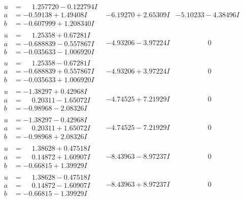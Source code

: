 \documentclass[1p]{elsarticle_modified}
\theoremstyle{definition}
\begin{document}
$$\begin{array}{c|c|c}
\begin{aligned}
u &= \phantom{-}1.257720 - 0.122794 I \\
a &= -0.59138 + 1.49408 I \\
b &= -0.607999 + 1.208340 I\end{aligned}
 & -6.19270 + 2.65309 I & -5.10233 - 4.38496 I \\ \hline\begin{aligned}
u &= \phantom{-}1.25358 + 0.67281 I \\
a &= -0.688839 - 0.557867 I \\
b &= -0.035633 - 1.006920 I\end{aligned}
 & -4.93206 - 3.97224 I & \phantom{-0.000000 } 0 \\ \hline\begin{aligned}
u &= \phantom{-}1.25358 - 0.67281 I \\
a &= -0.688839 + 0.557867 I \\
b &= -0.035633 + 1.006920 I\end{aligned}
 & -4.93206 + 3.97224 I & \phantom{-0.000000 } 0 \\ \hline\begin{aligned}
u &= -1.38297 + 0.42968 I \\
a &= \phantom{-}0.20311 - 1.65072 I \\
b &= -0.98968 - 2.08326 I\end{aligned}
 & -4.74525 + 7.21929 I & \phantom{-0.000000 } 0 \\ \hline\begin{aligned}
u &= -1.38297 - 0.42968 I \\
a &= \phantom{-}0.20311 + 1.65072 I \\
b &= -0.98968 + 2.08326 I\end{aligned}
 & -4.74525 - 7.21929 I & \phantom{-0.000000 } 0 \\ \hline\begin{aligned}
u &= \phantom{-}1.38628 + 0.47518 I \\
a &= \phantom{-}0.14872 + 1.60907 I \\
b &= -0.66815 + 1.39929 I\end{aligned}
 & -8.43963 - 8.97237 I & \phantom{-0.000000 } 0 \\ \hline\begin{aligned}
u &= \phantom{-}1.38628 - 0.47518 I \\
a &= \phantom{-}0.14872 - 1.60907 I \\
b &= -0.66815 - 1.39929 I\end{aligned}
 & -8.43963 + 8.97237 I & \phantom{-0.000000 } 0 \\ \hline\begin{aligned}

\end{aligned}
\end{array}$$
\end{document}
